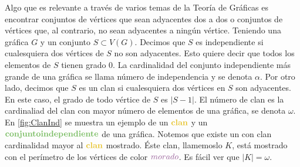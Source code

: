     Algo que es relevante a trav\'es de varios temas de la Teor\'ia de
     Gr\'aficas es encontrar conjuntos de v\'ertices que sean adyacentes dos a
     dos o conjuntos de v\'ertices que, al contrario, no sean adyacentes a
     ning\'un v\'ertice. Teniendo una gr\'afica $G$ y un conjunto $S \subset
     V(G)$. Decimos que $S$ es independiente si cualesquiera dos v\'ertices de
     $S$ no son adyacentes. Esto quiere decir que todos los elementos de $S$
     tienen grado $0$. La cardinalidad del conjunto independiente m\'as grande
     de una gr\'afica se llama n\'umero de independencia y se denota $\alpha$.
     Por otro lado, decimos que $S$ es un clan si cualesquiera dos v\'ertices en
     $S$ son adyacentes. En este caso, el grado de todo v\'ertice de $S$ es
     $|S-1|$. El n\'umero de clan es la cardinaliad del clan con mayor n\'umero
     de elementos de una gr\'afica, se denota $\omega$. En \cref{fig:ClanInd} se
     muestra un ejemplo de un ${\color{amarillo}\bf clan}$ y un
     ${\color{verde}\bf conjunto independiente}$ de una gr\'afica. Notemos que
     existe un con clan cardinalidad mayor al ${\color{amarillo}\bf clan}$ mostrado.
     \'Este clan, llamemoslo $K$, est\'a mostrado con el per\'imetro de los
     v\'ertices de color ${\color{morado}morado}$. Es f\'acil ver que $|K| =
     \omega$.


